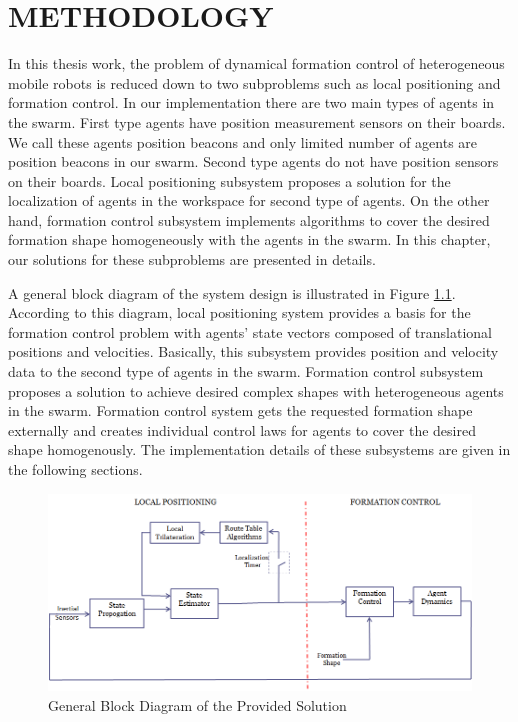 

\chapter{METHODOLOGY}
\label{chp:Methodology}








In this thesis work, the problem of dynamical formation control of heterogeneous mobile robots is reduced down to two subproblems such as local positioning and formation control.  In our implementation there are two main types of agents in the swarm. First type agents have position measurement sensors on their boards. We call these agents position beacons and only limited number of agents are position beacons in our swarm. Second type agents do not have position sensors on their boards. Local positioning subsystem proposes a solution for the localization of agents in the workspace for second type of agents. On the other hand, formation control subsystem implements algorithms to cover the desired formation shape homogeneously with the agents in the swarm. In this chapter, our solutions for these subproblems are presented in details.

A general block diagram of the system design is illustrated in Figure \ref{general_system}. According to this diagram, local positioning system provides a basis for the formation control problem with agents' state vectors composed of translational positions and velocities. Basically, this subsystem provides position and velocity data to the second type of agents in the swarm. Formation control subsystem proposes a solution to achieve desired complex shapes with heterogeneous agents in the swarm. Formation control system gets the requested formation shape externally and creates individual control laws for agents to cover the desired shape homogenously. The implementation details of these subsystems are given in the following sections. 
\begin{figure}[H]
\caption{General Block Diagram of the Provided Solution} \label{general_system}
\centering
\includegraphics[scale = 0.58]{general_scheme}
\end{figure}

